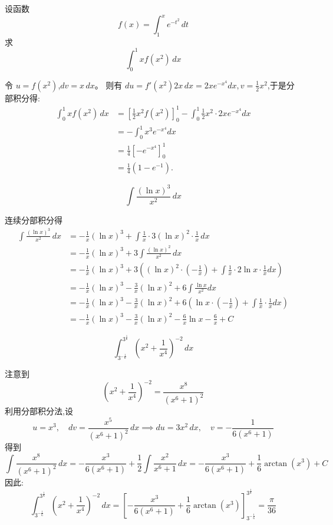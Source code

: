 \begin{questions}
    \question 设函数 
    \[
    f(x) = \int_1^x e^{-t^2} \, dt
    \]
    求
    \[
    \int_0^1 x f(x^2) \, dx
    \]
    \begin{solution}
        令 \( u = f(x^2) \),\( dv = x\, dx \)。  
        则有 \( du = f'(x^2) 2x\, dx = 2x e^{-x^4} dx , v = \frac{1}{2} x^2 \),于是分部积分得:
        \begin{align*}
        \int_0^1 x f(x^2)\, dx
        &= \left[ \frac{1}{2} x^2 f(x^2) \right]_0^1 - \int_0^1 \frac{1}{2} x^2 \cdot 2x e^{-x^4} dx \\
        &= - \int_0^1 x^3 e^{-x^4} dx \\
        &= \frac{1}{4} \left[ -e^{-x^4} \right]_0^1 \\
        &= \frac{1}{4}(1 - e^{-1}).
        \end{align*}
    \end{solution}
        
    \question
    \[
    \int \frac{(\ln x)^3}{x^2} \, dx
    \]
    \begin{solution}
        连续分部积分得
        \begin{align*}
        \int \frac{(\ln x)^3}{x^2}\, dx
        &= -\frac{1}{x}(\ln x)^3+\int \frac{1}{x} \cdot 3(\ln x)^2 \cdot \frac{1}{x}\,dx\\
        &= -\frac{1}{x}(\ln x)^3+3\int \frac{(\ln x)^2}{x^2}\,dx\\
        &= -\frac{1}{x}(\ln x)^3+3\left((\ln x)^{2}\cdot \left(-\frac{1}{x}\right)+\int \frac{1}{x}\cdot 2\ln x\cdot \frac{1}{x}dx\right) \\
        &= -\frac{1}{x}(\ln x)^3 -\frac{3}{x}(\ln x)^{2}+6 \int \frac{\ln x}{x^{2}}dx \\
        &= -\frac{1}{x}(\ln x)^3 -\frac{3}{x}(\ln x)^{2}+6 \left(\ln x \cdot \left(-\frac{1}{x}\right)+\int \frac{1}{x}\cdot\frac{1}{x} dx\right) \\
        &= -\frac{1}{x}(\ln x)^3 -\frac{3}{x}(\ln x)^{2} - \frac{6}{x} \ln x - \frac{6}{x}+C
        \end{align*}
    \end{solution}

    \question
    \[
    \int_{3^{-\frac{1}{6}}}^{3^{\frac{1}{6}}} \left(x^2 + \frac{1}{x^4}\right)^{-2} \, dx
    \]
    \begin{solution}
        注意到
        \[
        \left(x^2 + \frac{1}{x^4}\right)^{-2} = \frac{x^8}{(x^6 + 1)^2}
        \]
        利用分部积分法,设
        \[
        u = x^3, \quad dv = \frac{x^5}{(x^6+1)^2} \, dx \implies du = 3x^2 \, dx, \quad v = -\frac{1}{6(x^6+1)}
        \]
        得到
        \[
        \int \frac{x^8}{(x^6 + 1)^2} \, dx = -\frac{x^3}{6(x^6+1)} + \frac{1}{2} \int \frac{x^2}{x^6+1} \, dx = -\frac{x^3}{6(x^6+1)} + \frac{1}{6} \arctan(x^3) + C
        \]
        因此:
        \[
        \int_{3^{-\frac{1}{6}}}^{3^{\frac{1}{6}}} \left(x^2 + \frac{1}{x^4}\right)^{-2} \, dx = \left[ -\frac{x^3}{6(x^6+1)} + \frac{1}{6} \arctan(x^3) \right]_{3^{-\frac{1}{6}}}^{3^{\frac{1}{6}}} = \frac{\pi}{36}
        \]
    \end{solution}


\end{questions}
